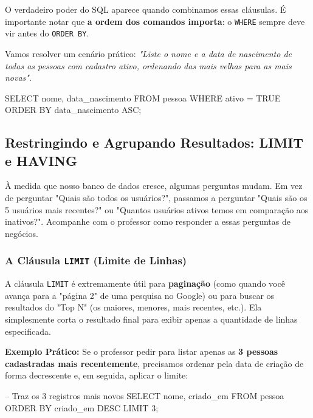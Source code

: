 O verdadeiro poder do SQL aparece quando combinamos essas cláusulas. É importante notar que \textbf{a ordem dos comandos importa}: o \texttt{WHERE} sempre deve vir antes do \texttt{ORDER BY}.

Vamos resolver um cenário prático: \textit{"Liste o nome e a data de nascimento de todas as pessoas com cadastro ativo, ordenando das mais velhas para as mais novas"}.

\begin{sqlcode}
SELECT nome, data_nascimento
FROM pessoa
WHERE ativo = TRUE
ORDER BY data_nascimento ASC;
\end{sqlcode}


\subsection{Restringindo e Agrupando Resultados: LIMIT e HAVING}

\begin{tcolorbox}[colback=blue!5,colframe=blue!40!black,title=Exercício Dirigido com o Professor: Top Resultados e Agrupamentos]
À medida que nosso banco de dados cresce, algumas perguntas mudam. Em vez de perguntar "Quais são todos os usuários?", passamos a perguntar "Quais são os 5 usuários mais recentes?" ou "Quantos usuários ativos temos em comparação aos inativos?". Acompanhe com o professor como responder a essas perguntas de negócios.
\end{tcolorbox}

\subsubsection{A Cláusula \texttt{LIMIT} (Limite de Linhas)}

A cláusula \texttt{LIMIT} é extremamente útil para \textbf{paginação} (como quando você avança para a "página 2" de uma pesquisa no Google) ou para buscar os resultados do "Top N" (os maiores, menores, mais recentes, etc.). Ela simplesmente corta o resultado final para exibir apenas a quantidade de linhas especificada.


\textbf{Exemplo Prático:} Se o professor pedir para listar apenas as \textbf{3 pessoas cadastradas mais recentemente}, precisamos ordenar pela data de criação de forma decrescente e, em seguida, aplicar o limite:

\begin{sqlcode}
-- Traz os 3 registros mais novos
SELECT nome, criado_em
FROM pessoa
ORDER BY criado_em DESC
LIMIT 3;
\end{sqlcode}

